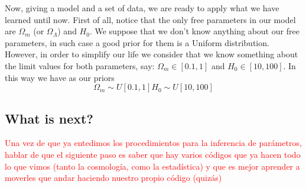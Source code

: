 \documentclass[onecolumn,           %
               showpacs,            %
               preprintnumbers,     %
               aps,                 %
               letterpaper,             %
               superscriptaddress,      %
               nofootinbib,         %
               tightenlines,        %
               floats,floatfix      %
               ,usenatbib,
               ]{revtex4-1}
\begin{document}
Now, giving a model and a set of data, we are ready to apply what we have learned until now. First of all, notice that the only free parameters in our model are $\Omega_m$ (or $\Omega_\Lambda$) and $H_0$. We suppose that we don't know anything about our free parameters, in such case a good prior for them is a Uniform distribution. However, in order to simplify our life we consider that we know something about the limit values for both parameters,  say: $\Omega_m\in [0.1,1]$ and $H_0\in [10,100]$. In this way we have as our priors
\begin{subequations}
\begin{equation}
\Omega_m\sim U[0.1,1]
\end{equation}
\begin{equation}
H_0\sim U[10,100]
\end{equation}
\end{subequations} 
\subsection{What is next?}

\textcolor{red}{Una vez de que ya entedimos los procedimientos para la inferencia de par\'ametros, hablar de que el siguiente paso es saber que hay varios c\'odigos que ya hacen todo lo que vimos (tanto la cosmolog\'ia, como la estad\'istica) y que es mejor aprender a moverles que andar haciendo nuestro propio código (quiz\'as)}



\end{document}
